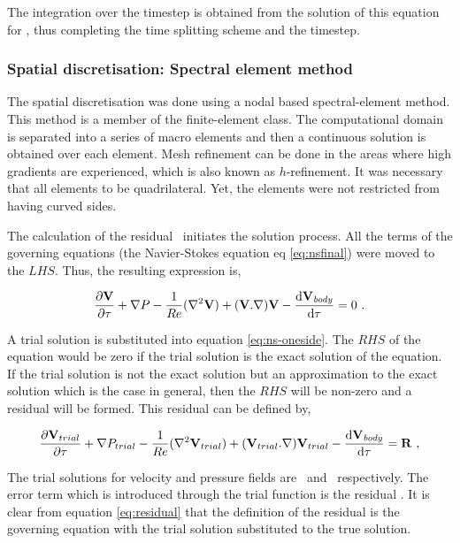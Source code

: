 The integration over the timestep is obtained from the solution of this equation  for \Vnext, thus completing the time splitting scheme and the timestep.


\subsubsection{Spatial discretisation: Spectral element method}
 
 The spatial discretisation was done using a nodal based spectral-element method. This method is a member of the finite-element class. The computational domain is separated into a series of macro elements and then a continuous solution is obtained over each element. Mesh refinement can be done in the areas where high gradients are experienced, which is also known as $h$-refinement. It was necessary that all elements to be quadrilateral. Yet, the elements were not restricted from having curved sides.
 
 The calculation of the residual \residual\ initiates the solution process. All the terms of the governing equations (the Navier-Stokes equation eq \ref{eq:nsfinal}) were moved to the $LHS$. Thus, the resulting expression is, 
 
 \begin{equation} \centering
 \label{eq:ns-oneside}
 \pderiv{\vecV}{\tau} + \grad{\Pres} - \frac{1}{\reynoldsnumber}(\gradsq{\vecV}) + (\vecV.\nabla)\vecV - \accframe = 0 ~.
 \end{equation}
 
 A trial solution is substituted into equation \ref{eq:ns-oneside}. The $RHS$ of the equation would be zero if the trial solution is the exact solution of the equation. If the trial solution is not the exact solution but an approximation to the exact solution which is the case in general, then the $RHS$ will be non-zero and a residual will be formed. This residual can be defined by, 
 
 \begin{equation} \centering
 \label{eq:residual}
 \pderiv{\Vtrial}{\tau} +\grad{\Ptrial} - \frac{1}{\reynoldsnumber}(\gradsq{\Vtrial}) + (\Vtrial.\nabla)\Vtrial - \accframe = \residual ~,
 \end{equation}
 
 The trial solutions for velocity and pressure fields are \Vtrial\ and \Ptrial\ respectively. The error term which is introduced through the trial function is the residual \residual. It is clear from equation \ref{eq:residual} that the definition of the residual is the governing equation with the trial solution substituted to the true solution.
 
